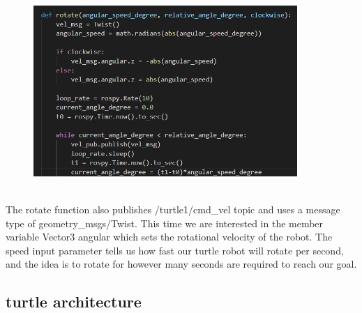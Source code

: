 \documentclass{article}
\begin{document}
\begin{figure}[htp]
    \includegraphics[width=10cm]{rotate.png}
    \label{fig:rotate}
\end{figure} \\
The rotate function also publishes /turtle1/cmd\_vel topic and uses a message type of geometry\_msgs/Twist. This time we are interested 
in the member variable Vector3 angular which sets the rotational velocity of the robot. The speed input parameter tells us how fast our turtle robot will rotate per second, and the idea is to rotate for however many seconds are required to reach our goal. 
\subsection{turtle architecture}

\newpage
\end{document}
